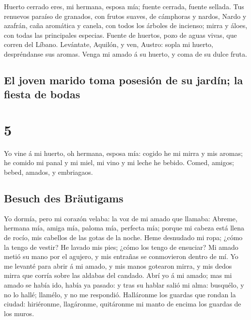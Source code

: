  Huerto cerrado eres, mi hermana, esposa mía; fuente
cerrada, fuente sellada.  Tus renuevos paraíso de granados,
con frutos suaves, de cámphoras y nardos,  Nardo y azafrán,
caña aromática y canela, con todos los árboles de incienso; mirra y
áloes, con todas las principales especias.  Fuente de
huertos, pozo de aguas vivas, que corren del Líbano. 
Levántate, Aquilón, y ven, Austro: sopla mi huerto, despréndanse sus
aromas. Venga mi amado á su huerto, y coma de su dulce fruta.

\hypertarget{el-joven-marido-toma-posesiuxf3n-de-su-jarduxedn-la-fiesta-de-bodas}{%
\subsection{El joven marido toma posesión de su jardín; la fiesta de
bodas}\label{el-joven-marido-toma-posesiuxf3n-de-su-jarduxedn-la-fiesta-de-bodas}}

\hypertarget{section-4}{%
\section{5}\label{section-4}}

 Yo vine á mi huerto, oh hermana, esposa mía: cogido he mi
mirra y mis aromas; he comido mi panal y mi miel, mi vino y mi leche he
bebido. Comed, amigos; bebed, amados, y embriagaos.

\hypertarget{besuch-des-bruxe4utigams}{%
\subsection{Besuch des Bräutigams}\label{besuch-des-bruxe4utigams}}

 Yo dormía, pero mi corazón velaba: la voz de mi amado que
llamaba: Abreme, hermana mía, amiga mía, paloma mía, perfecta mía;
porque mi cabeza está llena de rocío, mis cabellos de las gotas de la
noche.  Heme desnudado mi ropa; ¿cómo la tengo de vestir? He
lavado mis pies; ¿cómo los tengo de ensuciar?  Mi amado
metió su mano por el agujero, y mis entrañas se conmovieron dentro de
mí.  Yo me levanté para abrir á mi amado, y mis manos
gotearon mirra, y mis dedos mirra que corría sobre las aldabas del
candado.  Abrí yo á mi amado; mas mi amado se había ido,
había ya pasado: y tras su hablar salió mi alma: busquélo, y no lo
hallé; llamélo, y no me respondió.  Halláronme los guardas
que rondan la ciudad: hiriéronme, llagáronme, quitáronme mi manto de
encima los guardas de los muros.

